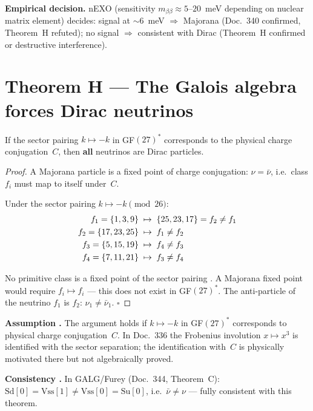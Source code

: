 \textbf{Empirical decision.} nEXO (sensitivity $m_{\beta\beta}\approx5$--$20$~meV depending on nuclear matrix element) decides:
signal at $\sim6$~meV $\Rightarrow$ Majorana (Doc.~340 confirmed, Theorem~H refuted);
no signal $\Rightarrow$ consistent with Dirac (Theorem~H confirmed or destructive interference).

\section{Theorem H --- The Galois algebra forces Dirac neutrinos}

\begin{theorem}
If the sector pairing $k \mapsto -k$ in GF$(27)^*$ corresponds to the physical
charge conjugation~$C$, then \textbf{all} neutrinos are Dirac particles.
\end{theorem}

\begin{proof}
A Majorana particle is a fixed point of charge conjugation: $\nu=\bar\nu$,
i.e.\ class $f_i$ must map to itself under~$C$.

Under the sector pairing $k \mapsto -k \pmod{26}$:
\begin{align}
f_1=\{1,3,9\} &\;\mapsto\; \{25,23,17\} = f_2 \neq f_1 \notag\\
f_2=\{17,23,25\} &\;\mapsto\; f_1 \neq f_2 \notag\\
f_3=\{5,15,19\} &\;\mapsto\; f_4 \neq f_3 \notag\\
f_4=\{7,11,21\} &\;\mapsto\; f_3 \neq f_4 \notag
\end{align}

No primitive class is a fixed point of the sector pairing \BM.
A Majorana fixed point would require $f_i \mapsto f_i$ --- this does not exist
in GF$(27)^*$. The anti-particle of the neutrino $f_1$ is $f_2$: $\nu_1 \neq \bar\nu_1$. \qquad$\square$
\end{proof}

\textbf{Assumption \SM.} The argument holds if $k\mapsto-k$ in GF$(27)^*$
corresponds to physical charge conjugation~$C$. In Doc.~336 the Frobenius
involution $x\mapsto x^3$ is identified with the sector separation; the
identification with~$C$ is physically motivated there but not algebraically proved.

\textbf{Consistency \BM.} In GALG/Furey (Doc.~344, Theorem~C):
$\mathrm{Sd}[0]=\mathrm{Vss}[1]\neq\mathrm{Vss}[0]=\mathrm{Su}[0]$,
i.e.\ $\bar\nu\neq\nu$ --- fully consistent with this theorem.


